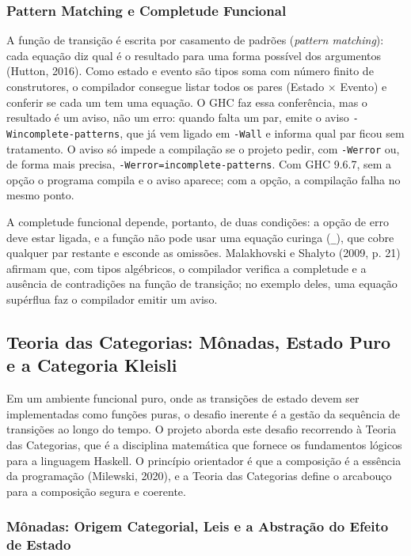 \documentclass[12pt,a4paper]{article}
\begin{document}
\subsubsection{Pattern Matching e Completude Funcional}
A função de transição é escrita por casamento de padrões (\textit{pattern matching}): cada equação diz qual é o resultado para uma forma possível dos argumentos (Hutton, 2016). Como estado e evento são tipos soma com número finito de construtores, o compilador consegue listar todos os pares (Estado $\times$ Evento) e conferir se cada um tem uma equação. O GHC faz essa conferência, mas o resultado é um aviso, não um erro: quando falta um par, emite o aviso \texttt{-Wincomplete-patterns}, que já vem ligado em \texttt{-Wall} e informa qual par ficou sem tratamento. O aviso só impede a compilação se o projeto pedir, com \texttt{-Werror} ou, de forma mais precisa, \texttt{-Werror=incomplete-patterns}. Com GHC 9.6.7, sem a opção o programa compila e o aviso aparece; com a opção, a compilação falha no mesmo ponto.

A completude funcional depende, portanto, de duas condições: a opção de erro deve estar ligada, e a função não pode usar uma equação curinga (\texttt{\_}), que cobre qualquer par restante e esconde as omissões. Malakhovski e Shalyto (2009, p. 21) afirmam que, com tipos algébricos, o compilador verifica a completude e a ausência de contradições na função de transição; no exemplo deles, uma equação supérflua faz o compilador emitir um aviso.

\subsection{Teoria das Categorias: Mônadas, Estado Puro e a Categoria Kleisli}
Em um ambiente funcional puro, onde as transições de estado devem ser implementadas como funções puras, o desafio inerente é a gestão da sequência de transições ao longo do tempo. O projeto aborda este desafio recorrendo à Teoria das Categorias, que é a disciplina matemática que fornece os fundamentos lógicos para a linguagem Haskell. O princípio orientador é que a composição é a essência da programação (Milewski, 2020), e a Teoria das Categorias define o arcabouço para a composição segura e coerente.

\subsubsection{Mônadas: Origem Categorial, Leis e a Abstração do Efeito de Estado}
\end{document}
